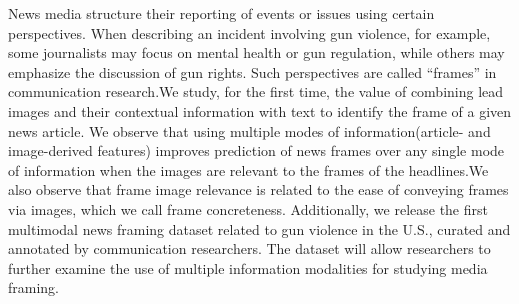 News media structure their reporting of events or issues using certain perspectives. When describing an incident involving gun violence, for example, some journalists may focus on mental health or gun regulation, while others may emphasize the discussion of gun rights. Such perspectives are called ``frames'' in communication research.We study, for the first time, the value of combining lead images and their contextual information with text to identify the frame of a given news article. We observe that using multiple modes of information(article- and image-derived features) improves prediction of news frames over any single mode of information when the images are relevant to the frames of the headlines.We also observe that frame image relevance is related to the ease of conveying frames via images, which we call frame concreteness. Additionally, we release the first multimodal news framing dataset related to gun violence in the U.S., curated and annotated by communication researchers. The dataset will allow researchers to further examine the use of multiple information modalities for studying media framing.
